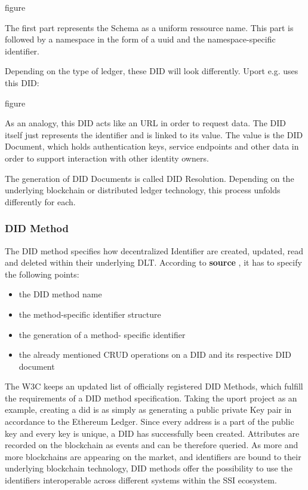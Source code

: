 {figure }

The first part represents the Schema as a uniform ressource name. This part is followed by a namespace in the form of a uuid and the namespace-specific identifier. 

Depending on the type of ledger, these DID will look differently. Uport e.g. uses this DID: 

{figure }

As an analogy, this DID acts like an URL in order to request data. The DID itself just represents the identifier and is linked to its value. The value is the DID Document, which holds authentication keys, service endpoints and other data in order to support interaction with other identity owners. 

The generation of DID Documents is called DID Resolution. Depending on the underlying blockchain or distributed ledger technology, this process unfolds differently for each. 

\subsubsection{DID Method}
The DID method specifies how decentralized Identifier are created, updated, read and deleted within their underlying DLT. According to \textbf{source} , it has to specify the following points:


\begin{itemize}
    \item the DID method name 
    \item the method-specific identifier structure
    \item the generation of a method- specific identifier
    \item the already mentioned CRUD operations on a DID and its respective DID document 
\end{itemize}

The W3C keeps an updated list of officially registered DID Methods, which fulfill the requirements of a DID method specification. 
Taking the uport project as an example, creating a did is as simply as generating a public private Key pair in accordance to the Ethereum Ledger. Since every address is a part of the public key and every key is unique, a DID has successfully been created. 
Attributes are recorded on the blockchain as events and can be therefore queried. 
As more and more blockchains are appearing on the market, and identifiers are bound to their underlying blockchain technology, DID methods offer the possibility to use the identifiers interoperable across different systems within the SSI ecosystem.

